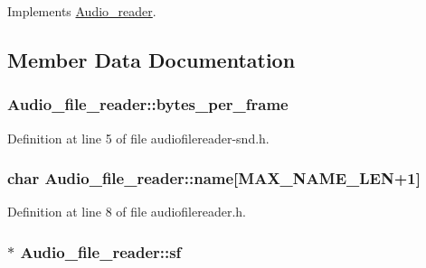 Implements \hyperlink{class_audio__reader_a736640d60600e59561e9caccae519a26}{Audio\+\_\+reader}.



\subsection{Member Data Documentation}
\subsubsection[{\texorpdfstring{bytes\+\_\+per\+\_\+frame}{bytes_per_frame}}]{ Audio\+\_\+file\+\_\+reader\+::bytes\+\_\+per\+\_\+frame}\hypertarget{class_audio__file__reader_a61b1c3c92febe3a8f4030e0fa66b4106}{}\label{class_audio__file__reader_a61b1c3c92febe3a8f4030e0fa66b4106}


Definition at line 5 of file audiofilereader-\/snd.\+h.

\subsubsection[{\texorpdfstring{name}{name}}]{\setlength{\rightskip}{0pt plus 5cm}char Audio\+\_\+file\+\_\+reader\+::name\mbox{[}{\bf M\+A\+X\+\_\+\+N\+A\+M\+E\+\_\+\+L\+EN}+1\mbox{]}}\hypertarget{class_audio__file__reader_ac2b48e388075405ac91bdcdfee78a2c9}{}\label{class_audio__file__reader_ac2b48e388075405ac91bdcdfee78a2c9}


Definition at line 8 of file audiofilereader.\+h.

\subsubsection[{\texorpdfstring{sf}{sf}}]{$\ast$ Audio\+\_\+file\+\_\+reader\+::sf}\hypertarget{class_audio__file__reader_a09686628785daa65c278299282731b30}{}\label{class_audio__file__reader_a09686628785daa65c278299282731b30}


